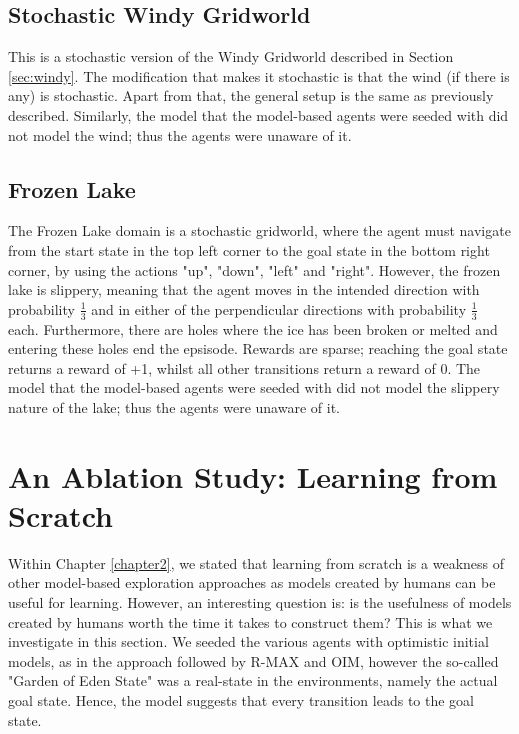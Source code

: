 \subsection{Stochastic Windy Gridworld}
This is a stochastic version of the Windy Gridworld described in Section \ref{sec:windy}. The modification that makes it stochastic is that the wind (if there is any) is stochastic. Apart from that, the general setup is the same as previously described. Similarly, the model that the model-based agents were seeded with did not model the wind; thus the agents were unaware of it.


\subsection{Frozen Lake}
The Frozen Lake domain \cite{1606.01540} is a stochastic gridworld, where the agent must navigate from the start state in the top left corner to the goal state in the bottom right corner, by using the actions "up", "down", "left" and "right". However, the frozen lake is slippery, meaning that the agent moves in the intended direction with probability $\frac{1}{3}$ and in either of the perpendicular directions with probability $\frac{1}{3}$ each. Furthermore, there are holes where the ice has been broken or melted and entering these holes end the epsisode. Rewards are sparse; reaching the goal state returns a reward of +1, whilst all other transitions return a reward of 0. The model that the model-based agents were seeded with did not model the slippery nature of the lake; thus the agents were unaware of it.

\section{An Ablation Study: Learning from Scratch}
Within Chapter \ref{chapter2}, we stated that learning from scratch is a weakness of other model-based exploration approaches as models created by humans can be useful for learning. However, an interesting question is: is the usefulness of models created by humans worth the time it takes to construct them? This is what we investigate in this section. We seeded the various agents with optimistic initial models, as in the approach followed by R-MAX and OIM, however the so-called "Garden of Eden State" was a real-state in the environments, namely the actual goal state. Hence, the model suggests that every transition leads to the goal state.



